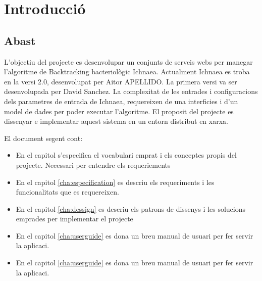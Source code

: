 
\chapter*{Introducci\'{o}}

\section{Abast}
L'objectiu del projecte es desenvolupar un conjunts de serveis webs per manegar l'algoritme de Backtracking bacteriol\`{o}gic Ichnaea. Actualment Ichnaea es troba en la versi 2.0, desenvolupat per Aitor APELLIDO. La primera versi va ser desenvolupada per David Sanchez. La complexitat de les entrades i configuracions dels parametres de entrada de  Ichnaea, requereixen de una interficies i d'un model de dades per poder executar l'algoritme. El proposit del projecte es dissenyar e implementar aquest sistema en un entorn distribut en xarxa. 

El document segent cont:
\begin{itemize}
\item En el capitol  s'especifica el vocabulari emprat i els conceptes propis del projecte. Necessari per entendre els requeriements
\item En el capitol \ref{cha:especification} es descriu els requeriments i les funcionalitats que es requereixen.
\item En el capitol \ref{cha:dessign} es descriu els patrons de dissenys i les solucions emprades per implementar el projecte
\item En el capitol \ref{cha:userguide} es dona un breu manual de usuari per fer servir la aplicaci.
\item En el capitol \ref{cha:userguide} es dona un breu manual de usuari per fer servir la aplicaci.

\end{itemize}

